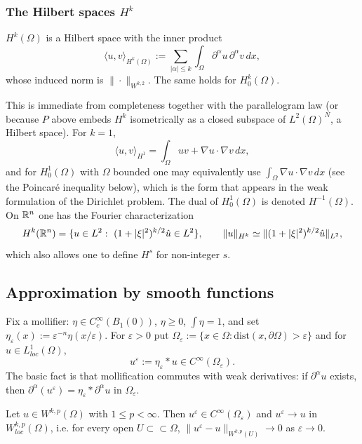 \subsubsection{The Hilbert spaces $H^k$}
\begin{proposition}
$H^k(\Omega)$ is a Hilbert space with the inner product
$$\langle u,v\rangle_{H^k(\Omega)}:=\sum_{|\alpha|\leq k}\int_\Omega\partial^\alpha u\,\partial^\alpha v\,dx,$$
whose induced norm is $\|\cdot\|_{W^{k,2}}$. The same holds for $H^k_0(\Omega)$.
\end{proposition}
This is immediate from completeness together with the parallelogram law (or because $P$ above embeds $H^k$ isometrically as a closed subspace of $L^2(\Omega)^N$, a Hilbert space). For $k=1$,
$$\langle u,v\rangle_{H^1}=\int_\Omega uv+\nabla u\cdot\nabla v\,dx,$$
and for $H^1_0(\Omega)$ with $\Omega$ bounded one may equivalently use $\int_\Omega\nabla u\cdot\nabla v\,dx$ (see the Poincar\'e inequality below), which is the form that appears in the weak formulation of the Dirichlet problem. The dual of $H^1_0(\Omega)$ is denoted $H^{-1}(\Omega)$. On $\mathbb{R}^n$ one has the Fourier characterization
$$H^k(\bbR^n)=\{u\in L^2:\ (1+|\xi|^2)^{k/2}\hat u\in L^2\},\qquad \|u\|_{H^k}\simeq\|(1+|\xi|^2)^{k/2}\hat u\|_{L^2},$$
which also allows one to define $H^s$ for non-integer $s$.

\subsection{Approximation by smooth functions}
Fix a mollifier: $\eta\in C_c^\infty(B_1(0))$, $\eta\geq0$, $\int\eta=1$, and set $\eta_\varepsilon(x):=\varepsilon^{-n}\eta(x/\varepsilon)$. For $\varepsilon>0$ put $\Omega_\varepsilon:=\{x\in\Omega:\mathrm{dist}(x,\partial\Omega)>\varepsilon\}$ and for $u\in L^1_{loc}(\Omega)$,
$$u^\varepsilon:=\eta_\varepsilon*u\in C^\infty(\Omega_\varepsilon).$$
The basic fact is that mollification commutes with weak derivatives: if $\partial^\alpha u$ exists, then $\partial^\alpha(u^\varepsilon)=\eta_\varepsilon*\partial^\alpha u$ in $\Omega_\varepsilon$.

\begin{theorem}\label{thm:local_approx}
Let $u\in W^{k,p}(\Omega)$ with $1\leq p<\infty$. Then $u^\varepsilon\in C^\infty(\Omega_\varepsilon)$ and $u^\varepsilon\to u$ in $W^{k,p}_{loc}(\Omega)$, i.e. for every open $U\subset\subset\Omega$, $\|u^\varepsilon-u\|_{W^{k,p}(U)}\to0$ as $\varepsilon\to0$.
\end{theorem}

